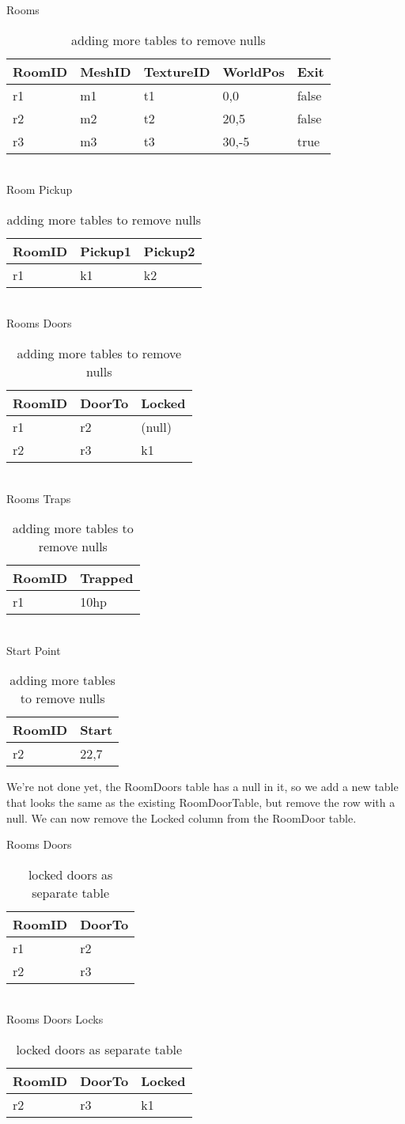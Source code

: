 \begin{table}[h]\footnotesize
Rooms \\
\begin{tabular}{lllll}
\bf{RoomID}&MeshID&TextureID&WorldPos&Exit \\
\hline
r1&m1&t1&0,0&false \\
r2&m2&t2&20,5&false \\
r3&m3&t3&30,-5&true \\
\end{tabular}\\
Room Pickup \\
\begin{tabular}{lll}
\bf{RoomID}&Pickup1&Pickup2 \\
\hline
r1&k1&k2 \\
\end{tabular}\\
Rooms Doors \\
\begin{tabular}{lll}
\bf{RoomID}&DoorTo&Locked \\
\hline
r1&r2&(null) \\
r2&r3&k1 \\
\end{tabular}\\
Rooms Traps\\
\begin{tabular}{ll}
\bf{RoomID}&Trapped \\
\hline
r1&10hp \\
\end{tabular}\\
Start Point \\
\begin{tabular}{ll}
\bf{RoomID}&Start \\
\hline
r2&22,7 \\
\end{tabular}
\caption{adding more tables to remove nulls}
\end{table}

We're not done yet, the RoomDoors table has a null in it, so we add a new table
that looks the same as the existing RoomDoorTable, but remove the row with a
null.  We can now remove the Locked column from the RoomDoor table.

\begin{table}[h]\footnotesize
Rooms Doors \\
\begin{tabular}{ll}
\bf{RoomID}&DoorTo \\
\hline
r1&r2 \\
r2&r3 \\
\end{tabular}\\
Rooms Doors Locks \\
\begin{tabular}{lll}
\bf{RoomID}&DoorTo&Locked \\
\hline
r2&r3&k1 \\
\end{tabular}
\caption{locked doors as separate table}
\end{table}

